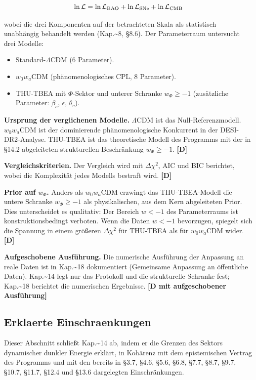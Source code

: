 ﻿\documentclass[11pt,letterpaper]{article}
\begin{document}
\begin{equation*}
  \resizebox{\ifdim\width>\linewidth \linewidth\else\width\fi}{!}{$\displaystyle \ln\mathcal{L} = \ln\mathcal{L}_{\text{BAO}} + \ln\mathcal{L}_{\text{SNe}} + \ln\mathcal{L}_{\text{CMB}}$}
\end{equation*}

wobei die drei Komponenten auf der betrachteten Skala als statistisch unabhängig behandelt werden (Kap.\textasciitilde{}8, §8.6). Der Parameterraum untersucht drei Modelle:

\begin{itemize}[leftmargin=*]
\item Standard-$\Lambda$CDM (6 Parameter).
\item $w_0w_a$CDM (phänomenologisches CPL, 8 Parameter).
\item THU-TBEA mit $\Phi$-Sektor und unterer Schranke $w_\Phi \geq -1$ (zusätzliche Parameter: $\beta_c$, $\epsilon$, $\theta_c$).
\end{itemize}

\textbf{Ursprung der verglichenen Modelle.} $\Lambda$CDM ist das Null-Referenzmodell. $w_0w_a$CDM ist der dominierende phänomenologische Konkurrent in der DESI-DR2-Analyse. THU-TBEA ist das theoretische Modell des Programms mit der in §14.2 abgeleiteten strukturellen Beschränkung $w_\Phi \geq -1$. \textbf{[D]}

\textbf{Vergleichskriterien.} Der Vergleich wird mit $\Delta\chi^2$, AIC und BIC berichtet, wobei die Komplexität jedes Modells bestraft wird. \textbf{[D]}

\textbf{Prior auf $w_\Phi$.} Anders als $w_0w_a$CDM erzwingt das THU-TBEA-Modell die untere Schranke $w_\Phi \geq -1$ als physikalischen, aus dem Kern abgeleiteten Prior. Dies unterscheidet es qualitativ: Der Bereich $w < -1$ des Parameterraums ist konstruktionsbedingt verboten. Wenn die Daten $w < -1$ bevorzugen, spiegelt sich die Spannung in einem größeren $\Delta\chi^2$ für THU-TBEA als für $w_0w_a$CDM wider. \textbf{[D]}

\textbf{Aufgeschobene Ausführung.} Die numerische Ausführung der Anpassung an reale Daten ist in Kap.\textasciitilde{}18 dokumentiert (Gemeinsame Anpassung an öffentliche Daten). Kap.\textasciitilde{}14 legt nur das Protokoll und die strukturelle Schranke fest; Kap.\textasciitilde{}18 berichtet die numerischen Ergebnisse. \textbf{[D mit aufgeschobener Ausführung]}
\subsection{Erklaerte Einschraenkungen}
Dieser Abschnitt schließt Kap.\textasciitilde{}14 ab, indem er die Grenzen des Sektors dynamischer dunkler Energie erklärt, in Kohärenz mit dem epistemischen Vertrag des Programms und mit den bereits in §3.7, §4.6, §5.6, §6.8, §7.7, §8.7, §9.7, §10.7, §11.7, §12.4 und §13.6 dargelegten Einschränkungen.
\end{document}
